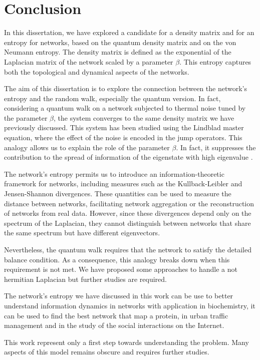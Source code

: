 \chapter*{Conclusion}

In this dissertation, we have explored a candidate for a density matrix and for an entropy for networks, based on the quantum density matrix and on the von Neumann entropy. The density matrix is defined as the exponential of the Laplacian matrix of the network scaled by a  parameter $\beta$.
This entropy captures both the topological and dynamical aspects of the networks.

The aim of this dissertation is to explore the connection between the network's entropy and the random walk, especially the quantum version.
In fact, considering a quantum walk on a network subjected to thermal noise tuned by the parameter $\beta$, the system converges to the same density matrix we have previously discussed. This system has been studied using the Lindblad master equation, where the effect of the noise is encoded in the jump operators. 
This analogy allows us to explain the role of the parameter $\beta$. In fact, it suppresses the contribution to the spread of information of the eigenstate with high eigenvalue .  

The network's entropy permits us to introduce an information-theoretic framework for networks, including measures such as the Kullback-Leibler and Jensen-Shannon divergences. These quantities can be used to measure the distance between networks, facilitating network aggregation or the reconstruction of networks from real data. However, since these divergences depend only on the spectrum of the Laplacian, they cannot distinguish between networks that share the same spectrum but have different eigenvectors.

Nevertheless, the quantum walk requires that the network to satisfy the detailed balance condition. As a consequence, this analogy breaks down when this requirement is not met. We have proposed some approaches to handle a not hermitian Laplacian but further studies are required.

The network's entropy we have discussed in this work can be use to better understand information dynamics in networks with application in biochemistry, it can be used to find the best network that map a protein, in urban traffic management and in the study of the social interactions on the Internet.

This work represent only a first step towards understanding the problem. Many aspects of this model remains obscure and requires further studies.